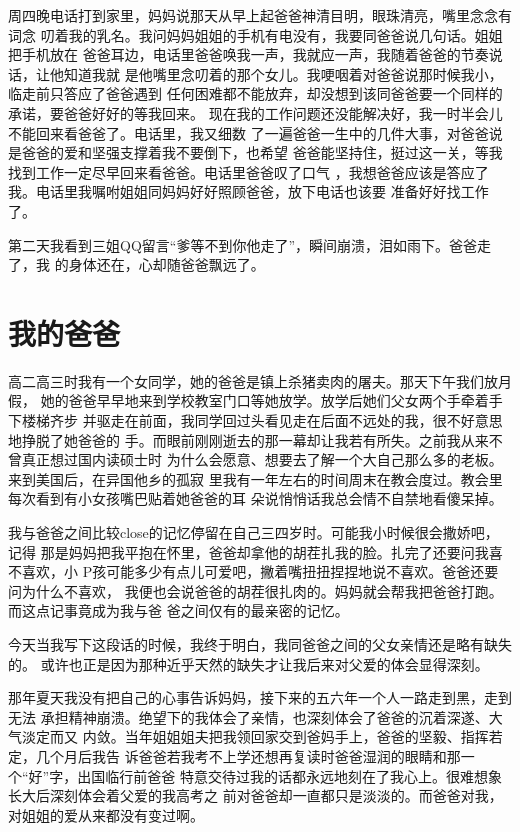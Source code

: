 \documentclass[12pt]{book}
\begin{document}
周四晚电话打到家里，妈妈说那天从早上起爸爸神清目明，眼珠清亮，嘴里念念有词念
叨着我的乳名。我问妈妈姐姐的手机有电没有，我要同爸爸说几句话。姐姐把手机放在
爸爸耳边，电话里爸爸唤我一声，我就应一声，我随着爸爸的节奏说话，让他知道我就
是他嘴里念叨着的那个女儿。我哽咽着对爸爸说那时候我小，临走前只答应了爸爸遇到
任何困难都不能放弃，却没想到该同爸爸要一个同样的承诺，要爸爸好好的等我回来。
现在我的工作问题还没能解决好，我一时半会儿不能回来看爸爸了。电话里，我又细数
了一遍爸爸一生中的几件大事，对爸爸说是爸爸的爱和坚强支撑着我不要倒下，也希望
爸爸能坚持住，挺过这一关，等我找到工作一定尽早回来看爸爸。电话里爸爸叹了口气
，我想爸爸应该是答应了我。电话里我嘱咐姐姐同妈妈好好照顾爸爸，放下电话也该要
准备好好找工作了。

第二天我看到三姐QQ留言“爹等不到你他走了”，瞬间崩溃，泪如雨下。爸爸走了，我
的身体还在，心却随爸爸飘远了。
\section{我的爸爸}
\label{sec-9-41}

高二高三时我有一个女同学，她的爸爸是镇上杀猪卖肉的屠夫。那天下午我们放月假，
她的爸爸早早地来到学校教室门口等她放学。放学后她们父女两个手牵着手下楼梯齐步
并驱走在前面，我同学回过头看见走在后面不远处的我，很不好意思地挣脱了她爸爸的
手。而眼前刚刚逝去的那一幕却让我若有所失。之前我从来不曾真正想过国内读硕士时
为什么会愿意、想要去了解一个大自己那么多的老板。来到美国后，在异国他乡的孤寂
里我有一年左右的时间周末在教会度过。教会里每次看到有小女孩嘴巴贴着她爸爸的耳
朵说悄悄话我总会情不自禁地看傻呆掉。

我与爸爸之间比较close的记忆停留在自己三四岁时。可能我小时候很会撒娇吧，记得
那是妈妈把我平抱在怀里，爸爸却拿他的胡茬扎我的脸。扎完了还要问我喜不喜欢，小
P孩可能多少有点儿可爱吧，撇着嘴扭扭捏捏地说不喜欢。爸爸还要问为什么不喜欢，
我便也会说爸爸的胡茬很扎肉的。妈妈就会帮我把爸爸打跑。而这点记事竟成为我与爸
爸之间仅有的最亲密的记忆。

今天当我写下这段话的时候，我终于明白，我同爸爸之间的父女亲情还是略有缺失的。
或许也正是因为那种近乎天然的缺失才让我后来对父爱的体会显得深刻。

那年夏天我没有把自己的心事告诉妈妈，接下来的五六年一个人一路走到黑，走到无法
承担精神崩溃。绝望下的我体会了亲情，也深刻体会了爸爸的沉着深遂、大气淡定而又
内敛。当年姐姐姐夫把我领回家交到爸妈手上，爸爸的坚毅、指挥若定，几个月后我告
诉爸爸若我考不上学还想再复读时爸爸湿润的眼睛和那一个“好”字，出国临行前爸爸
特意交待过我的话都永远地刻在了我心上。很难想象长大后深刻体会着父爱的我高考之
前对爸爸却一直都只是淡淡的。而爸爸对我，对姐姐的爱从来都没有变过啊。
\end{document}
